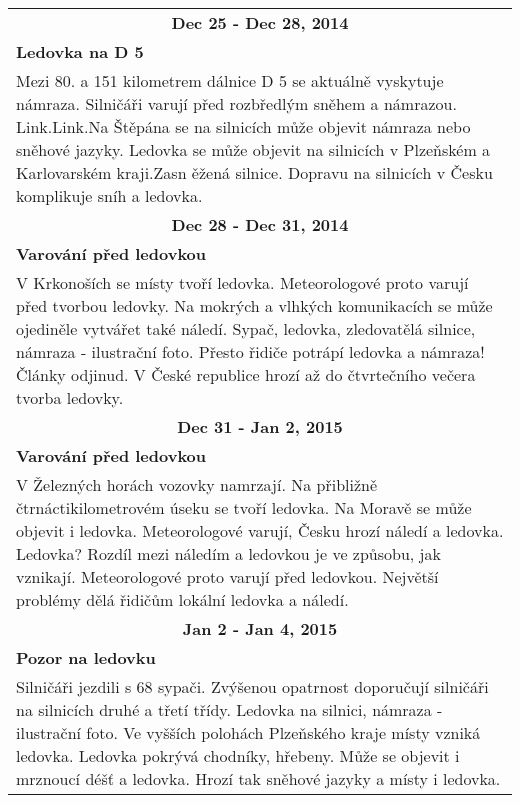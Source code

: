 \begin{tabularx}{\linewidth}{l l}
                \multicolumn{2}{c}{\bf Dec 25 - Dec 28, 2014} \\
                \multicolumn{2}{p{\linewidth}}{\bf Ledovka na D 5} \\
                \multicolumn{2}{p{\linewidth}}{Mezi 80. a 151 kilometrem dálnice D 5 se aktuálně vyskytuje námraza. Silničáři varují před rozbředlým sněhem a námrazou. Link.Link.Na Štěpána se na silnicích může objevit námraza nebo sněhové jazyky. Ledovka se může objevit na silnicích v Plzeňském a Karlovarském kraji.Zasn ěžená silnice. Dopravu na silnicích v Česku komplikuje sníh a ledovka.} \\ \midrule
                
                \multicolumn{2}{c}{\bf Dec 28 - Dec 31, 2014} \\
                \multicolumn{2}{p{\linewidth}}{\bf Varování před ledovkou} \\
                \multicolumn{2}{p{\linewidth}}{V Krkonoších se místy tvoří ledovka. Meteorologové proto varují před tvorbou ledovky. Na mokrých a vlhkých komunikacích se může ojediněle vytvářet také náledí. Sypač, ledovka, zledovatělá silnice, námraza - ilustrační foto. Přesto řidiče potrápí ledovka a námraza! Články odjinud. V České republice hrozí až do čtvrtečního večera tvorba ledovky.} \\ \midrule
                
                \multicolumn{2}{c}{\bf Dec 31 - Jan 2, 2015} \\
                \multicolumn{2}{p{\linewidth}}{\bf Varování před ledovkou} \\
                \multicolumn{2}{p{\linewidth}}{V Železných horách vozovky namrzají. Na přibližně čtrnáctikilometrovém úseku se tvoří ledovka. Na Moravě se může objevit i ledovka. Meteorologové varují, Česku hrozí náledí a ledovka. Ledovka? Rozdíl mezi náledím a ledovkou je ve způsobu, jak vznikají. Meteorologové proto varují před ledovkou. Největší problémy dělá řidičům lokální ledovka a náledí.} \\ \midrule
                
                \multicolumn{2}{c}{\bf Jan 2 - Jan 4, 2015} \\
                \multicolumn{2}{p{\linewidth}}{\bf Pozor na ledovku} \\
                \multicolumn{2}{p{\linewidth}}{Silničáři jezdili s 68 sypači. Zvýšenou opatrnost doporučují silničáři na silnicích druhé a třetí třídy. Ledovka na silnici, námraza - ilustrační foto. Ve vyšších polohách Plzeňského kraje místy vzniká ledovka. Ledovka pokrývá chodníky, hřebeny. Může se objevit i mrznoucí déšť a ledovka. Hrozí tak sněhové jazyky a místy i ledovka.} \\ \midrule
                

\end{tabularx}
